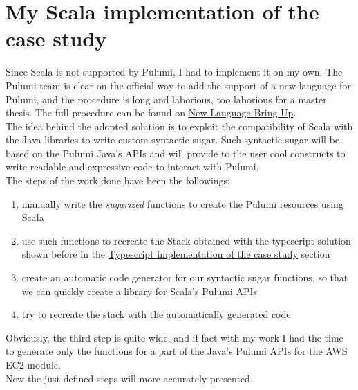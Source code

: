 \section{My Scala implementation of the case study}
Since Scala is not supported by Pulumi, I had to implement it on my own.
The Pulumi team is clear on the official way to add the support of a new language for Pulumi, and the procedure is long and laborious, too laborious for a master thesis.
The full procedure can be found on \href{https://github.com/pulumi/pulumi/wiki/New-Language-Bring-up}{New Language Bring Up}.\\
The idea behind the adopted solution is to exploit the compatibility of Scala with the Java libraries to write custom syntactic sugar.
Such syntactic sugar will be based on the Pulumi Java's APIs and will provide to the user cool constructs to write readable and expressive code to interact with Pulumi.\\
The steps of the work done have been the followings:
\begin{enumerate}
  \item manually write the \textit{sugarized} functions to create the Pulumi resources using Scala
  \item use such functions to recreate the Stack obtained with the typescript solution shown before in the \hyperref[sec:typescript-impl]{Typescript implementation of the case study} section
  \item create an automatic code generator for our syntactic sugar functions, so that we can quickly create a library for Scala's Pulumi APIs
  \item try to recreate the stack with the automatically generated code
\end{enumerate}
Obviously, the third step is quite wide, and if fact with my work I had the time to generate only the functions for a part of the Java's Pulumi APIs for the AWS EC2 module.\\
Now the just defined steps will more accurately presented.

